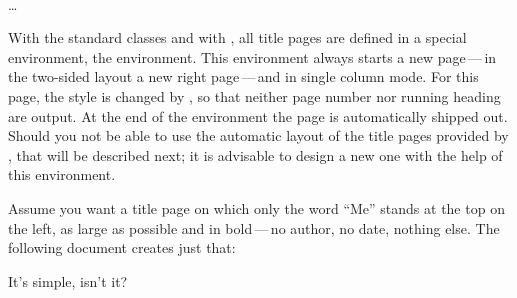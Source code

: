 \begin{Declaration}
  \\
  \quad\dots\\
\end{Declaration}%
%
With the standard classes and with {\KOMAScript}, all title pages are defined
in a special environment, the  environment.  This
environment always starts a new page\,---\,in the two-sided layout a new right
page\,---\,and in single column mode. For this page, the style is changed by
, so that neither page number nor
running heading are output. At the end of the environment the page is
automatically shipped out. Should you not be able to use the automatic layout
of the title pages provided by , that will be described next;
it is advisable to design a new one with the help of this environment.


\begin{Example}
  Assume you want a title page on which only the word ``Me'' stands at
  the top on the left, as large as possible and in bold\,---\,no
  author, no date, nothing else. The following document creates just
  that:
\ifCommonmaincls
{}
\else
{}
\fi
It's simple, isn't it?
\end{Example}
%


